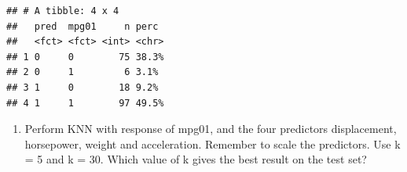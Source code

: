 \documentclass[]{article}
\newenvironment{Shaded}{\begin{snugshade}}{\end{snugshade}}
\newcommand{\CommentTok}[1]{\textcolor[rgb]{0.56,0.35,0.01}{\textit{#1}}}
\newcommand{\DataTypeTok}[1]{\textcolor[rgb]{0.13,0.29,0.53}{#1}}
\newcommand{\KeywordTok}[1]{\textcolor[rgb]{0.13,0.29,0.53}{\textbf{#1}}}
\newcommand{\NormalTok}[1]{#1}
\newcommand{\OperatorTok}[1]{\textcolor[rgb]{0.81,0.36,0.00}{\textbf{#1}}}
\newcommand{\StringTok}[1]{\textcolor[rgb]{0.31,0.60,0.02}{#1}}
\providecommand{\tightlist}{%
  \setlength{\itemsep}{0pt}\setlength{\parskip}{0pt}}
\begin{document}
\begin{Shaded}
\end{Shaded}

\begin{verbatim}
## # A tibble: 4 x 4
##   pred  mpg01     n perc 
##   <fct> <fct> <int> <chr>
## 1 0     0        75 38.3%
## 2 0     1         6 3.1% 
## 3 1     0        18 9.2% 
## 4 1     1        97 49.5%
\end{verbatim}

\begin{Shaded}
\end{Shaded}

\begin{enumerate}
\def\labelenumi{(\alph{enumi})}
\setcounter{enumi}{5}
\tightlist
\item
  Perform KNN with response of mpg01, and the four predictors
  displacement, horsepower, weight and acceleration. Remember to scale
  the predictors. Use k = 5 and k = 30. Which value of k gives the best
  result on the test set?
\end{enumerate}
\end{document}
